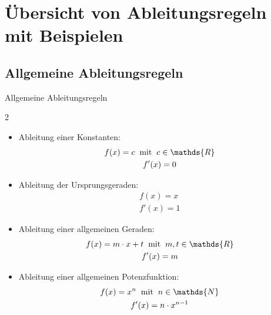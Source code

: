 \section{Übersicht von Ableitungsregeln mit Beispielen}  \label{AbleitungAllgemein}
\subsection{Allgemeine Ableitungsregeln}
\begin{merke}{Allgemeine Ableitungsregeln}{}
\begin{multicols}{2}
\begin{itemize}
    \item Ableitung einer Konstanten:
    \begin{gather*} 
	f(x) = c \hspace{0.2cm}\text{mit} \hspace{0.2cm} c \in \mathds{R}\\ 
	f'(x) = 0
	\end{gather*}
    \item Ableitung der Ursprungsgeraden:
    \begin{gather*} 
	f(x) = x \\ 
	f'(x) = 1
	\end{gather*} 
     \item Ableitung einer allgemeinen Geraden:
    \begin{gather*} 
	f(x) = m\cdot x + t  \hspace{0.2cm}\text{mit} \hspace{0.2cm} m,t \in \mathds{R}\\ 
	f'(x) = m
	\end{gather*}
 \item Ableitung einer allgemeinen Potenzfunktion:
    \begin{gather*} 
	f(x) = x^n  \hspace{0.2cm}\text{mit} \hspace{0.2cm} n \in \mathds{N}\\ 
	f'(x) =n \cdot x^{n-1}
	\end{gather*}
\end{itemize}    
\end{multicols}
\end{merke}
